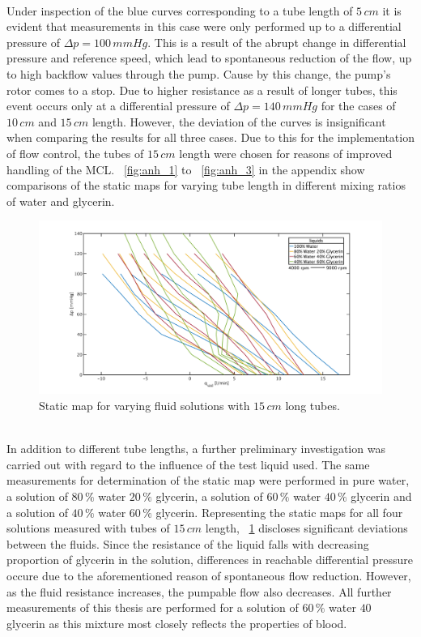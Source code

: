 \\Under inspection of the blue curves corresponding to a tube length of $5\, cm$ it is evident that measurements in this case were only performed up to a differential pressure of $\Delta{p}=100 \, mmHg$. This is a result of the abrupt change in differential pressure and reference speed, which lead to spontaneous reduction of the flow, up to high backflow values through the pump. Cause by this change, the pump's rotor comes to a stop. Due to higher resistance as a result of longer tubes, this event occurs only at a differential pressure of $\Delta{p}=140\, mmHg$ for the cases of $10\, cm$ and $15\, cm$ length. However, the deviation of the curves is insignificant when comparing the results for all three cases. Due to this for the implementation of flow control, the tubes of $15\, cm$ length were chosen for reasons of improved handling of the MCL. \figurename~\ref{fig:anh_1} to \figurename~\ref{fig:anh_3} in the appendix show comparisons of the static maps for varying tube length in different mixing ratios of water and glycerin.
\begin{figure}[ht]
  \centering
  \includegraphics[width=\textwidth]{images/chapt_4/long_liquid_change_new.pdf}
  \caption[Static map for varying fluid solution with $15\,cm$ long tubes]{Static map for varying fluid solutions with $15\,cm$ long tubes.}
  \label{fig:long_tubes}
\end{figure}
\\In addition to different tube lengths, a further preliminary investigation was carried out with regard to the influence of the test liquid used. The same measurements for determination of the static map were performed in pure water, a solution of $80\, \%$ water $20\, \%$ glycerin, a solution of $60\, \%$ water $40\, \%$ glycerin and a solution of $40\, \%$ water $60\, \%$ glycerin. Representing the static maps for all four solutions measured with tubes of $15\, cm$ length, \figurename~\ref{fig:long_tubes} discloses significant deviations between the fluids. Since the resistance of the liquid falls with decreasing proportion of glycerin in the solution, differences in reachable differential pressure occure due to the aforementioned reason of spontaneous flow reduction. However, as the fluid resistance increases, the pumpable flow also decreases. All further measurements of this thesis are performed for a solution of $60\, \%$ water $40\,$ glycerin as this mixture most closely reflects the properties of blood.
